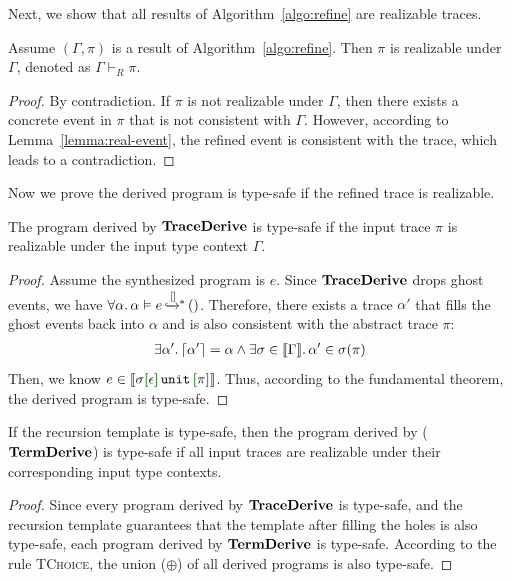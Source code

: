 Next, we show that all results of Algorithm~\ref{algo:refine} are realizable traces.

\begin{lemma}
  \label{lemma:real-trace}
Assume $(\Gamma, \pi)$ is a result of Algorithm~\ref{algo:refine}. Then $\pi$ is realizable under $\Gamma$, denoted as $\Gamma \vdash_{R} \pi$.
\end{lemma}
\begin{proof}
By contradiction. If $\pi$ is not realizable under $\Gamma$, then there exists a concrete event in $\pi$ that is not consistent with $\Gamma$. However, according to Lemma~\ref{lemma:real-event}, the refined event is consistent with the trace, which leads to a contradiction.
\end{proof}

Now we prove the derived program is type-safe if the refined trace is realizable.

\begin{lemma}
  \label{lemma:trace-derive-sound}
  The program derived by $\S{TraceDerive}$ is type-safe if the input trace $\pi$ is realizable under the input type context $\Gamma$.
\end{lemma}
\begin{proof}
Assume the synthesized program is $e$.
Since $\S{TraceDerive}$ drops ghost events, we have $\forall \alpha.\, \msteptr{\alpha}{e}{[]}{()}$. Therefore, there exists a trace $\alpha'$ that fills the ghost events back into $\alpha$ and is also consistent with the abstract trace $\pi$:
\begin{align*}
  \exists \alpha'.\, \eraseGhost{\alpha'} = \alpha \land \exists \sigma \in \denot{\Gamma}.\, \alpha' \in \sigma(\pi)
\end{align*}
Then, we know $e \in \denot{\sigma{\uhat{\epsilon}{\Unit}{\pi}}}$. Thus, according to the fundamental theorem, the derived program is type-safe.
\end{proof}

\begin{theorem}
  \label{theorem:term-derive-sound}
  If the recursion template is type-safe, then the program derived by ($\S{TermDerive}$) is type-safe if all input traces are realizable under their corresponding input type contexts.
\end{theorem}
\begin{proof}
  Since every program derived by $\S{TraceDerive}$ is type-safe, and the recursion template guarantees that the template after filling the holes is also type-safe, each program derived by $\S{TermDerive}$ is type-safe.
  According to the rule \textsc{TChoice}, the union ($\oplus$) of all derived programs is also type-safe.
\end{proof}

